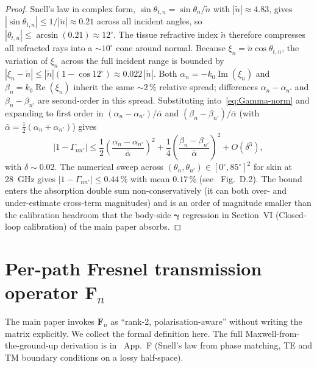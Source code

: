 \documentclass[10pt,journal,twocolumn]{IEEEtran}
\newcommand{\Fn}{\mathbf{F}_n}
\newcommand{\gammab}{\bm{\gamma}}
\newcommand{\ntilde}{\tilde{n}}
\DeclareMathOperator{\RE}{Re}
\DeclareMathOperator{\IM}{Im}
\theoremstyle{plain}
\theoremstyle{definition}
\begin{document}
\begin{proof}
Snell's law in complex form, $\sin\theta_{t,n} = \sin\theta_n/\ntilde$
with $|\ntilde| \approx 4.83$, gives
$|\sin\theta_{t,n}| \leq 1/|\ntilde| \approx 0.21$ across all
incident angles, so $|\theta_{t,n}| \leq \arcsin(0.21) \approx
12^{\circ}$. The tissue refractive index $\ntilde$ therefore
compresses all refracted rays into a $\sim\!10^{\circ}$ cone around
normal. Because $\xi_n = \ntilde \cos\theta_{t,n}$, the variation
of $\xi_n$ across the full incident range is bounded by
$|\xi_n - \ntilde| \leq |\ntilde|(1 - \cos 12^{\circ}) \approx
0.022\,|\ntilde|$. Both $\alpha_n = -k_0 \IM(\xi_n)$ and
$\beta_n = k_0 \RE(\xi_n)$ inherit the same $\sim\!2\,\%$ relative
spread; differences $\alpha_n - \alpha_{n'}$ and $\beta_n - \beta_{n'}$
are second-order in this spread. Substituting into~\eqref{eq:Gamma-norm}
and expanding to first order in
$(\alpha_n - \alpha_{n'})/\bar\alpha$ and
$(\beta_n - \beta_{n'})/\bar\alpha$ (with
$\bar\alpha = \tfrac{1}{2}(\alpha_n + \alpha_{n'})$) gives
\begin{equation}
  |1 - \Gamma_{nn'}|
    \leq \frac{1}{2}
    \left(\frac{\alpha_n - \alpha_{n'}}{\bar\alpha}\right)^2
    + \frac{1}{4}
    \left(\frac{\beta_n - \beta_{n'}}{\bar\alpha}\right)^2
    + O(\delta^3),
\end{equation}
with $\delta \sim 0.02$. The numerical sweep
across $(\theta_n, \theta_{n'}) \in [0^{\circ}, 85^{\circ}]^2$ for
skin at 28~GHz gives
$|1 - \Gamma_{nn'}| \leq 0.44\,\%$ with mean $0.17\,\%$
(see~\cite{WydaegheMonograph} Fig.~D.2). The bound enters the
absorption double sum non-conservatively (it can both over- and
under-estimate cross-term magnitudes) and is an order of magnitude
smaller than the calibration headroom that the body-side $\gammab$
regression in Section~VI (Closed-loop calibration) of the main paper absorbs.
\end{proof}

\section{Per-path Fresnel transmission operator $\mathbf{F}_n$}\label{si:Fn}

The main paper invokes $\Fn$ as ``rank-2, polarisation-aware''
without writing the matrix explicitly. We collect the formal
definition here. The full Maxwell-from-the-ground-up derivation is
in~\cite{WydaegheMonograph} App.~F (Snell's law from phase matching,
TE and TM boundary conditions on a lossy half-space).
\end{document}
